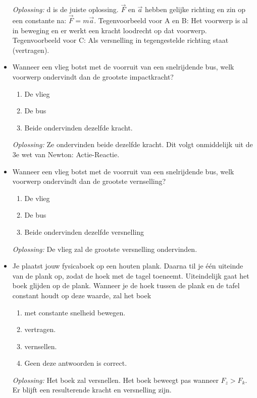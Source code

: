 \documentclass[12pt,a4paper]{article}
\begin{document}
\begin{itemize}
    \textit{Oplossing:} d is de juiste oplossing. $\vec{F}$ en $\vec{a}$ hebben gelijke richting en zin op een constante na: \(\vec{F} = m\vec{a}\). Tegenvoorbeeld voor A en B: Het voorwerp is al in beweging en er werkt een kracht loodrecht op dat voorwerp. Tegenvoorbeeld voor C: Als versnelling in tegengestelde richting staat (vertragen).
    \newline
    \item Wanneer een vlieg botst met de voorruit van een snelrijdende bus, welk voorwerp ondervindt dan de grootste impactkracht?
    \begin{enumerate}[label=\alph*]
    	\item De vlieg
    	\item De bus
    	\item Beide ondervinden dezelfde kracht.
    \end{enumerate}
    \textit{Oplossing:} Ze ondervinden beide dezelfde kracht. Dit volgt onmiddelijk uit de 3e wet van Newton: Actie-Reactie. 
    \newline
    \item Wanneer een vlieg botst met de voorruit van een snelrijdende bus, welk voorwerp ondervindt dan de grootste vernselling?
    \begin{enumerate}[label=\alph*]
    	\item De vlieg
    	\item De bus
    	\item Beide ondervinden dezelfde versnelling
    \end{enumerate}
    \textit{Oplossing:} De vlieg zal de grootste versnelling ondervinden. 
    \newline
    \item Je plaatst jouw fysicaboek op een houten plank. Daarna til je één uiteinde van de plank op, zodat de hoek met de tagel toeneemt. Uiteindelijk gaat het boek glijden op de plank. Wanneer je de hoek tussen de plank en de tafel constant houdt op deze waarde, zal het boek
    \begin{enumerate}[label=\alph*]
    	\item met constante snelheid bewegen.
    	\item vertragen.
    	\item vernsellen.
    	\item Geen deze antwoorden is correct. 
    \end{enumerate}
	\textit{Oplossing:} Het boek zal versnellen. Het boek beweegt pas wanneer \(F_z > F_k\). Er blijft een resulterende kracht en versnelling zijn. 

\end{itemize}
\end{document}
